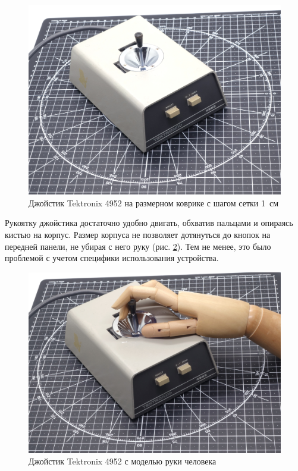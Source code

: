 \documentclass[11pt, a4paper]{article}
\begin{document}
\begin{figure}[h]
    \centering
    \includegraphics[scale=0.42]{1975_Tektronix_4952_Joystick/size_30.jpg}
    \caption{Джойстик Tektronix 4952 на размерном коврике с шагом сетки 1~см}
    \label{fig:TektronixJoystickSize}
\end{figure}

Рукоятку джойстика достаточно удобно двигать, обхватив пальцами и опираясь кистью на корпус. Размер корпуса не позволяет дотянуться до кнопок на передней панели, не убирая с него руку (рис. \ref{fig:TektronixJoystickHand}). Тем не менее, это было проблемой с учетом специфики использования устройства.

\begin{figure}[h]
    \centering
    \includegraphics[scale=0.42]{1975_Tektronix_4952_Joystick/hand_05.jpg}
    \caption{Джойстик Tektronix 4952 с моделью руки человека}
    \label{fig:TektronixJoystickHand}
\end{figure}
\end{document}
